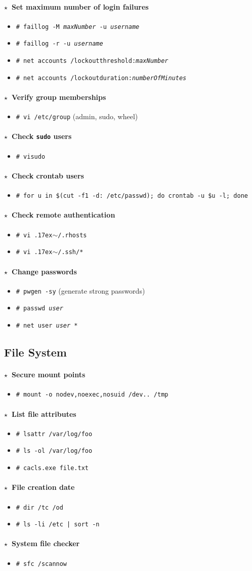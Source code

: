 \documentclass[10pt,landscape]{article}
\newcommand{\os}[1]{\texttt{\footnotesize{#1}}}
\newcommand{\unix}{\os{U}}
\newcommand{\bsd}{\os{B}}
\newcommand{\linux}{\os{L}}
\newcommand{\windows}{\os{W}}
\newenvironment{action}[1]
  {\paragraph{$\star$~#1}\begin{itemize}[leftmargin=1cm]}
  {\end{itemize}}
\newcommand{\cmd}[2]{\item[#1] {\small\tt\# #2}}
\newcommand{\comment}[1]{\textrm{\small(#1)}}
\newcommand{\home}{\raise.17ex\hbox{$\scriptstyle\sim$}}
\begin{document}
\begin{multicols*}{3}
\begin{action}{Set maximum number of login failures}
\cmd{\linux}{faillog -M \emph{maxNumber} -u \emph{username}}
\cmd{\linux}{faillog -r -u \emph{username}}
\cmd{\windows}{net accounts /lockoutthreshold:\emph{maxNumber}}
\cmd{\windows}{net accounts /lockoutduration:\emph{numberOfMinutes}}
\end{action}

\begin{action}{Verify group memberships}
\cmd{\unix}{vi /etc/group} \comment{admin, sudo, wheel}
\end{action}

\begin{action}{Check \texttt{sudo} users}
\cmd{\unix}{visudo}
\end{action}

\begin{action}{Check crontab users}
\cmd{\unix}{for u in \$(cut -f1 -d: /etc/passwd); do crontab -u \$u -l; done}
\end{action}

\begin{action}{Check remote authentication}
\cmd{\unix}{vi \home/.rhosts}
\cmd{\unix}{vi \home/.ssh/*}
\end{action}

\begin{action}{Change passwords}
\cmd{\unix}{pwgen -sy} \comment{generate strong passwords}
\cmd{\unix}{passwd \emph{user}}
\cmd{\windows}{net user \emph{user} *}
\end{action}

\subsection*{File System}

\begin{action}{Secure mount points}
\cmd{\unix}{mount -o nodev,noexec,nosuid /dev.. /tmp}
\end{action}

\begin{action}{List file attributes}
\cmd{\linux}{lsattr /var/log/foo}
\cmd{\bsd}{ls -ol /var/log/foo}
\cmd{\windows}{cacls.exe file.txt}
\end{action}

\begin{action}{File creation date}
\cmd{\windows}{dir /tc /od}
\cmd{\unix}{ls -li /etc | sort -n}
\end{action}

\begin{action}{System file checker }
\cmd{\windows}{sfc /scannow}
\end{action}


\end{multicols*}
\end{document}

